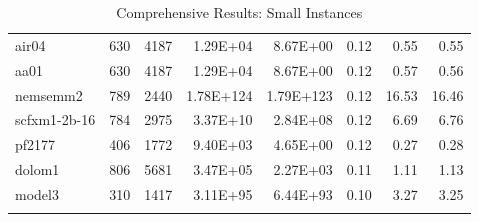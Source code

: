 \documentclass[10pt]{article}
\begin{document}
\begin{longtable}{|l|r|r|r|r|r|r|r|}
air04	&	630	&	4187	&	1.29E+04	&	8.67E+00	&	0.12	&	0.55	&	0.55	\\
aa01	&	630	&	4187	&	1.29E+04	&	8.67E+00	&	0.12	&	0.57	&	0.56	\\
nemsemm2	&	789	&	2440	&	1.78E+124	&	1.79E+123	&	0.12	&	16.53	&	16.46	\\
scfxm1-2b-16	&	784	&	2975	&	3.37E+10	&	2.84E+08	&	0.12	&	6.69	&	6.76	\\
pf2177	&	406	&	1772	&	9.40E+03	&	4.65E+00	&	0.12	&	0.27	&	0.28	\\
dolom1	&	806	&	5681	&	3.47E+05	&	2.27E+03	&	0.11	&	1.11	&	1.13	\\
model3	&	310	&	1417	&	3.11E+95	&	6.44E+93	&	0.10	&	3.27	&	3.25	\\
\hline
\caption{Comprehensive Results: Small Instances}
\small
\centering
\label{supptab:all_small}
\end{longtable}
\end{document}
